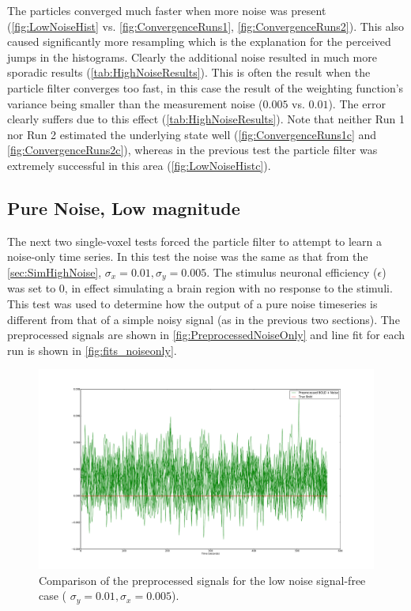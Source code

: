 The particles converged much faster when more noise was present (\autoref{fig:LowNoiseHist} vs.
\autoref{fig:ConvergenceRuns1}, \autoref{fig:ConvergenceRuns2}).
This also caused significantly more resampling which
is the explanation for the perceived jumps in the histograms.
Clearly the additional noise resulted in much more sporadic results (\autoref{tab:HighNoiseResults}).
This is often the
result when the particle filter converges too fast, in this case the result of the
weighting function's variance being smaller than the measurement noise ($0.005$ vs. $0.01$).
The error clearly suffers due to this effect (\autoref{tab:HighNoiseResults}).
Note that neither Run 1 nor Run 2 estimated the underlying state well (\autoref{fig:ConvergenceRuns1c}
and \autoref{fig:ConvergenceRuns2c}), whereas
in the previous test the particle filter was extremely successful in this area (\autoref{fig:LowNoiseHistc}).

\subsection{Pure Noise, Low magnitude}
\label{sec:PureNoiseLowMag}
The next two single-voxel tests forced the particle filter to attempt to learn a noise-only
time series. In this test the noise was the same as that from the \autoref{sec:SimHighNoise},
$\sigma_x = 0.01, \sigma_y = 0.005$. The stimulus neuronal efficiency ($\epsilon$) was set
to 0, in effect simulating a brain region with no response to the stimuli.
This test was used to determine how the output of a pure noise timeseries
is different from that of a simple noisy signal (as in the previous two sections).
The preprocessed signals are shown in \autoref{fig:PreprocessedNoiseOnly}
and line fit for each run is shown in \autoref{fig:fits_noiseonly}.


\begin{figure}[H]
\centering
\includegraphics[clip=true,trim=6cm 2cm 6cm 3.5cm,width=15cm]{images/preprocessed_noiseonly}
\caption{Comparison of the preprocessed signals for the low noise signal-free case (
$\sigma_y = 0.01, \sigma_x = 0.005$).}
\label{fig:PreprocessedNoiseOnly}
\end{figure}

